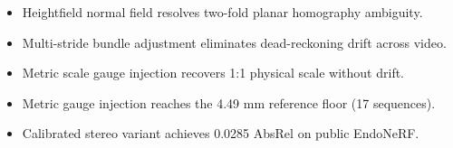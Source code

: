 \begin{itemize}
\item Heightfield normal field resolves two-fold planar homography ambiguity.
\item Multi-stride bundle adjustment eliminates dead-reckoning drift across video.
\item Metric scale gauge injection recovers 1:1 physical scale without drift.
\item Metric gauge injection reaches the 4.49 mm reference floor (17 sequences).
\item Calibrated stereo variant achieves 0.0285 AbsRel on public EndoNeRF.
\end{itemize}
